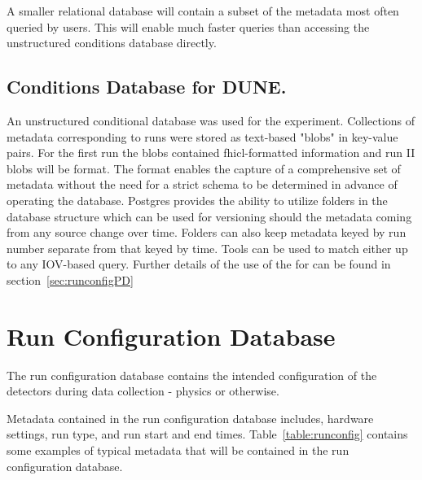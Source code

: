 \documentclass[../main-v1.tex]{subfiles}
\begin{document}
A smaller relational database will contain a subset of the metadata most often queried by users. This will enable much faster queries than accessing the unstructured conditions database directly.

\subsection{Conditions Database for DUNE.}

An unstructured conditional database was used for the  experiment. Collections of metadata corresponding to  runs were stored as text-based "blobs" in key-value pairs. For the first  run the blobs contained fhicl-formatted information and run II blobs will be  format. The  format enables the capture of a comprehensive set of metadata without the need for a strict schema to be determined in advance of operating the database. Postgres provides the ability to utilize folders in the database structure which can be used for versioning should the metadata coming from any source change over time. Folders can also keep metadata keyed by run number separate from that keyed by time. Tools can be used to match either up to any IOV-based query. Further details of the use of the  for  can be found in section~\ref{sec:runconfigPD} 

\section{Run Configuration Database}
\label{sec:db:config}  

The run configuration database contains the intended configuration of the detectors during data collection - physics or otherwise. 

Metadata contained in the run configuration database includes, hardware settings, run type, and run start and end times. Table~\ref{table:runconfig} contains some examples of typical metadata that will be contained in the run configuration database. 
\end{document}
